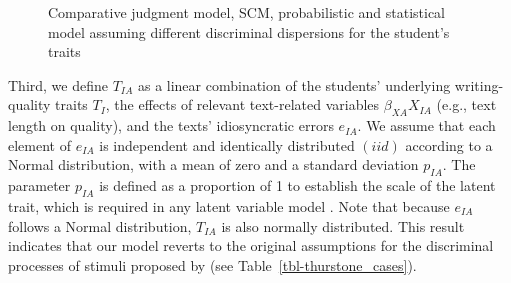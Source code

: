\documentclass[
  authoryear,
  review,
  1p]{elsarticle}
\begin{document}
\begin{figure}[H]
\begin{minipage}{0.33\linewidth}
\centering{

\[
\begin{aligned}
  O_{R} & \overset{iid}{\sim} \text{Bernoulli} \left[ \text{inv\_logit}( D_{R} ) \right] \\
  D_{R} & = \left( T_{IA}[i,a] - T_{IA}[h,b] \right) + B_{JK}[j,k] \\
  T_{IA} & = T_{I} + \beta_{XA} X_{IA} + e_{IA} \\
  T_{I} & = \beta_{XI} X_{I} + e_{I} \\
  B_{JK} & = B_{J} + \beta_{ZK} Z_{JK} + e_{JK} \\
  B_{J} & = \beta_{ZJ} Z_{J} + e_{J} \\
  e_{I} & \overset{iid}{\sim} \text{Normal}(0,s_{XI}) \\
  e_{J} & \overset{iid}{\sim} \text{Normal}(0,s_{ZJ}) \\
  e_{IA} & \overset{iid}{\sim} \text{Normal}(0, p_{IA}) \\  
  e_{JK} & \overset{iid}{\sim} \text{Normal}(0, p_{JK})
\end{aligned}
\]

}


\end{minipage}%

\caption{\label{fig-cj16}Comparative judgment model, SCM, probabilistic
and statistical model assuming different discriminal dispersions for the
student's traits}

\end{figure}%

Third, we define \(T_{IA}\) as a linear combination of the students'
underlying writing-quality traits \(T_{I}\), the effects of relevant
text-related variables \(\beta_{XA}X_{IA}\) (e.g., text length on
quality), and the texts' idiosyncratic errors \(e_{IA}\). We assume that
each element of \(e_{IA}\) is independent and identically distributed
\((iid)\) according to a Normal distribution, with a mean of zero and a
standard deviation \(p_{IA}\). The parameter \(p_{IA}\) is defined as a
proportion of 1 to establish the scale of the latent trait, which is
required in any latent variable model \citep{Depaoli_2021}. Note that
because \(e_{IA}\) follows a Normal distribution, \(T_{IA}\) is also
normally distributed. This result indicates that our model reverts to
the original assumptions for the discriminal processes of stimuli
proposed by \citet{Thurstone_1927b} (see
Table~\ref{tbl-thurstone_cases}).
\end{document}
